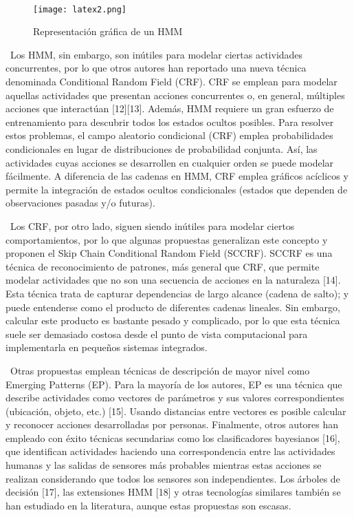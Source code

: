\documentclass{paper}
\begin{document}
\ \begin{figure}[H]
    \centering
    \texttt{[image: latex2.png]}
    \caption{Representación gráfica de un HMM}
    \label{fig:my_label}
\end{figure}

\ Los HMM, sin embargo, son inútiles para modelar ciertas actividades concurrentes, por lo que otros autores han reportado una nueva técnica denominada Conditional Random Field (CRF).
CRF se emplean para modelar aquellas actividades que presentan acciones concurrentes o, en
general, múltiples acciones que interactúan [12][13]. Además, HMM requiere un gran esfuerzo de entrenamiento para descubrir todos los estados ocultos posibles. Para resolver estos problemas, el campo aleatorio condicional (CRF) emplea probabilidades condicionales en lugar de distribuciones de probabilidad conjunta. Así, las actividades cuyas acciones se desarrollen en cualquier orden se puede modelar fácilmente. A diferencia de las cadenas en HMM, CRF emplea gráficos acíclicos y permite la integración de estados ocultos condicionales (estados que dependen de observaciones pasadas y/o futuras). 




\ Los CRF, por otro lado, siguen siendo inútiles para modelar ciertos comportamientos, por lo que algunas propuestas generalizan este concepto y proponen el Skip Chain Conditional Random Field (SCCRF). SCCRF es una técnica de reconocimiento de patrones, más general que CRF, que permite modelar actividades que no son una secuencia de acciones en la naturaleza [14]. Esta técnica trata de capturar dependencias de largo alcance (cadena de salto); y puede entenderse como el producto de diferentes cadenas lineales. Sin embargo, calcular este producto es bastante pesado y complicado, por lo que esta técnica suele ser demasiado costosa desde el punto de vista computacional para implementarla en pequeños sistemas integrados. 

\ Otras propuestas emplean técnicas de descripción de mayor nivel como Emerging Patterns (EP). Para la mayoría de los autores, EP es una técnica que describe actividades como vectores de parámetros y sus valores correspondientes (ubicación, objeto, etc.) [15]. Usando
distancias entre vectores es posible calcular y reconocer acciones desarrolladas por personas. Finalmente, otros autores han empleado con éxito técnicas secundarias como los clasificadores bayesianos [16], que identifican actividades haciendo una correspondencia entre las actividades humanas y las salidas de sensores más probables mientras estas acciones
se realizan considerando que todos los sensores son independientes. Los árboles de decisión [17], las extensiones HMM [18] y otras tecnologías similares también se han estudiado en la literatura, aunque estas propuestas son escasas. 
\end{document}
